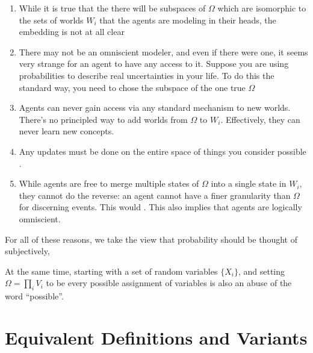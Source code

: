 \documentclass{article}
\begin{document}
	\begin{enumerate}
		\item While it is true that the there will be subspaces of $\Omega$ which are isomorphic to the sets of worlds $W_i$ that the agents are modeling in their heads, the embedding is not at all clear \todo{}

		\item There may not be an omniscient modeler, and even if there were one, it seems very strange for an agent to have any access to it. Suppose you are using probabilities to describe real uncertainties in your life. To do this the standard way, you need to chose the subspace of the one true $\Omega$ 

		\item Agents can never gain access via any standard mechanism to new worlds. There's no principled way to add worlds from $\Omega$ to $W_i$. Effectively, they can never learn new concepts.

		\item Any updates must be done on the entire space of things you consider possible .

		\item While agents are free to merge multiple states of $\Omega$ into a single state in $W_i$, they cannot do the reverse: an agent cannot have a finer granularity than $\Omega$ for discerning events. This would . This also implies that agents are logically omniscient.
	\end{enumerate}

	For all of these reasons, we take the view that probability should be thought of subjectively,


	At the same time, starting with a set of random variables $\{X_i\}$, and setting $\Omega = \prod_{i} V_i$ to be every possible assignment of variables is also an abuse of the word ``possible''.


	\section{Equivalent Definitions and Variants}
\end{document}
